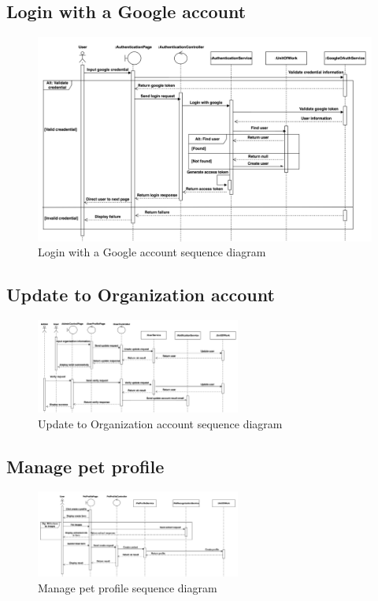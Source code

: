 \subsection{Login with a Google account}

\begin{figure}[H]
    \centering
    \includegraphics[width=1\textwidth]{Figures/login_gg_seq.png}
    \caption{Login with a Google account sequence diagram}
    \label{fig:login-google-seq}
\end{figure}

\subsection{Update to Organization account}

\begin{figure}[H]
    \centering
    \includegraphics[angle=-90,width=0.6\textwidth]{Figures/update_org_seq.png}
    \caption{Update to Organization account sequence diagram}
    \label{fig:update-org-seq}
\end{figure}
\clearpage

\subsection{Manage pet profile}

\begin{figure}[H]
    \centering
    \includegraphics[angle=-90,width=0.6\textwidth]{Figures/manage_pet_seq.png}
    \caption{Manage pet profile sequence diagram}
    \label{fig:manage-pet-seq}
\end{figure}
\clearpage

